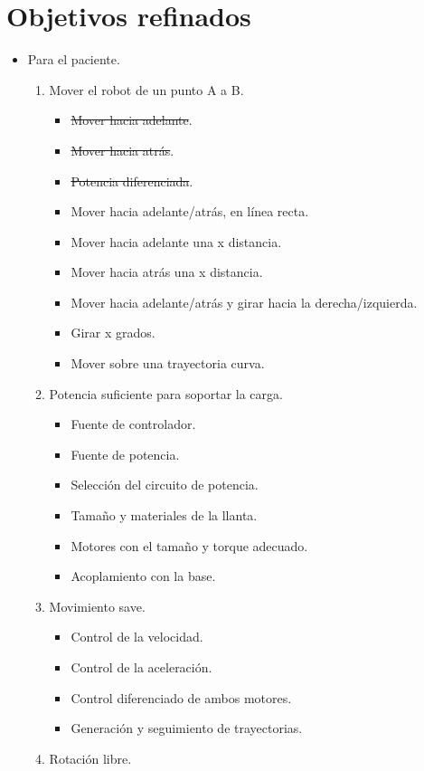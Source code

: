 \section{Objetivos refinados}
\begin{itemize}
	\item Para el paciente.
		\begin{enumerate}
			\item Mover el robot de un punto A a B.
				\begin{itemize}
					\item \st{Mover hacia adelante}.
					\item \st{Mover hacia atr\'as}.
					\item \st{Potencia diferenciada}.
					\item Mover hacia adelante/atrás, en línea
						recta.
					\item Mover hacia adelante una x distancia.
					\item Mover hacia atrás una x distancia.
					\item Mover hacia adelante/atrás y girar hacia
						la derecha/izquierda.
					\item Girar x grados.
					\item Mover sobre una trayectoria curva.
				\end{itemize}
			\item Potencia suficiente para soportar la carga.
				\begin{itemize}
					\item Fuente de controlador.
					\item Fuente de potencia.
					\item Selección del circuito de potencia.
					\item Tamaño y materiales de la llanta.
					\item Motores con el tamaño y torque adecuado.
					\item Acoplamiento con la base.
				\end{itemize}
			\item Movimiento save.
				\begin{itemize}
					\item Control de la velocidad.
					\item Control de la aceleración.
					\item Control diferenciado de ambos motores.
					\item Generación y seguimiento de trayectorias.
				\end{itemize}
			\item Rotación libre.

\end{enumerate}
\end{itemize}
